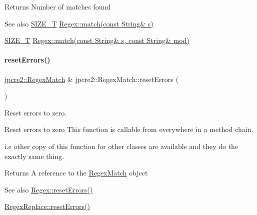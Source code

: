 \begin{DoxyReturn}{Returns}
Number of matches found 
\end{DoxyReturn}
\begin{DoxySeeAlso}{See also}
\hyperlink{namespacejpcre2_a2aac465ddcb123560c7c8215dd69246c}{S\+I\+Z\+E\+\_\+T} \hyperlink{classjpcre2_1_1Regex_a9ffbb6aa54cb97125f1b4211bc1d09a5_a9ffbb6aa54cb97125f1b4211bc1d09a5}{Regex\+::match(const String\& s)} 

\hyperlink{namespacejpcre2_a2aac465ddcb123560c7c8215dd69246c}{S\+I\+Z\+E\+\_\+T} \hyperlink{classjpcre2_1_1Regex_ab93775a93a0a537d09b9e9ab4a5a3894_ab93775a93a0a537d09b9e9ab4a5a3894}{Regex\+::match(const String\& s, const String\& mod)} 
\end{DoxySeeAlso}
\hypertarget{classjpcre2_1_1RegexMatch_aa19512638f2f5389384d6b9ad01c70c0_aa19512638f2f5389384d6b9ad01c70c0}{}\label{classjpcre2_1_1RegexMatch_aa19512638f2f5389384d6b9ad01c70c0_aa19512638f2f5389384d6b9ad01c70c0} 
\paragraph{\texorpdfstring{reset\+Errors()}{resetErrors()}}
{\footnotesize\ttfamily \hyperlink{classjpcre2_1_1RegexMatch}{jpcre2\+::\+Regex\+Match} \& jpcre2\+::\+Regex\+Match\+::reset\+Errors (\begin{DoxyParamCaption}{ }\end{DoxyParamCaption})}



Reset errors to zero. 

Reset errors to zero This function is callable from everywhere in a method chain.

i.\+e other copy of this function for other classes are available and they do the exactly same thing. \begin{DoxyReturn}{Returns}
A reference to the \hyperlink{classjpcre2_1_1RegexMatch}{Regex\+Match} object 
\end{DoxyReturn}
\begin{DoxySeeAlso}{See also}
\hyperlink{classjpcre2_1_1Regex_aff12a6e75ecd3e623875d12df49b3b89_aff12a6e75ecd3e623875d12df49b3b89}{Regex\+::reset\+Errors()} 

\hyperlink{classjpcre2_1_1RegexReplace_a1d708fe8f948d260a8e033cff7898f9c_a1d708fe8f948d260a8e033cff7898f9c}{Regex\+Replace\+::reset\+Errors()} 
\end{DoxySeeAlso}
\hypertarget{classjpcre2_1_1RegexMatch_ae586d43ec197c57c66086eeb4f8d83a1_ae586d43ec197c57c66086eeb4f8d83a1}{}\label{classjpcre2_1_1RegexMatch_ae586d43ec197c57c66086eeb4f8d83a1_ae586d43ec197c57c66086eeb4f8d83a1} 
